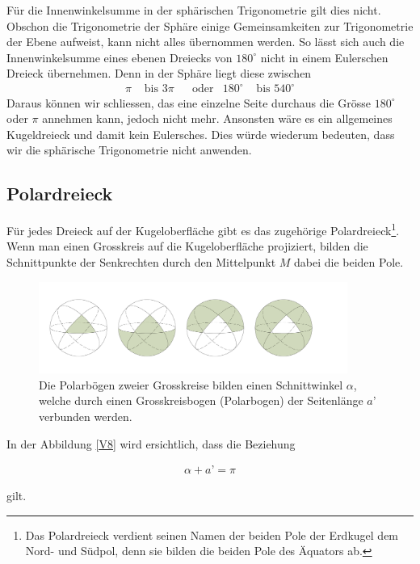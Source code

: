 \begin{refsection}
Für die Innenwinkelsumme in der sphärischen Trigonometrie gilt dies nicht. Obschon die Trigonometrie der Sphäre einige Gemeinsamkeiten zur Trigonometrie der Ebene aufweist, kann nicht alles übernommen werden.
So lässt sich auch die Innenwinkelsumme eines ebenen Dreiecks von $180^{\circ}$ nicht in einem Eulerschen Dreieck übernehmen.
Denn in der Sphäre liegt diese zwischen
\[
\begin{aligned}
\pi
&\text{ bis }
3\pi
&
&\text{oder}
&
180^{\circ}
&\text{ bis }
540^{\circ}
\end{aligned}
\]
Daraus können wir schliessen, das eine einzelne Seite durchaus die Grösse $180^{\circ}$ oder $\pi$ annehmen kann, jedoch nicht mehr. Ansonsten wäre es ein allgemeines Kugeldreieck und damit kein Eulersches. Dies würde wiederum bedeuten, dass wir die sphärische Trigonometrie nicht anwenden.


\subsection{Polardreieck}
Für jedes Dreieck auf der Kugeloberfläche gibt es das zugehörige Polardreieck\footnote{%
Das Polardreieck verdient seinen Namen der beiden Pole der Erdkugel dem Nord- und Südpol, denn sie bilden die beiden Pole des Äquators ab.}. Wenn man einen Grosskreis auf die Kugeloberfläche projiziert, bilden die Schnittpunkte der Senkrechten durch den Mittelpunkt $M$ dabei die beiden Pole. 

\begin{figure}[htbp]
\centering
\includegraphics[width=0.9\textwidth]{kugel/Dreiecksarten.jpg}
\caption{Die Polarbögen zweier Grosskreise bilden einen Schnittwinkel $\alpha$, welche durch einen Grosskreisbogen (Polarbogen) der Seitenlänge $a’$ verbunden werden.}
\label{V8}
\end{figure}

In der Abbildung \eqref{V8} wird ersichtlich, dass die Beziehung

\begin{align*}
\alpha + a’ = \pi
\end{align*}

gilt. 


\end{refsection}

